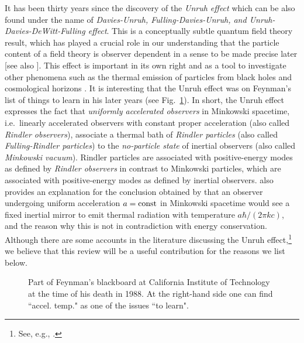 \documentclass[12pt,nofootinbib,floatfix,aps,prd,showpacs,amsmath,amssymb,eqsecnum]{revtex4-2}
\begin{document}
It has been thirty years since the discovery of the {\em Unruh
effect} \cite{Unruh76} which can be also found under the name of 
{\em Davies-Unruh, Fulling-Davies-Unruh, {\rm and} 
Unruh-Davies-DeWitt-Fulling effect}. This is a conceptually subtle 
quantum field theory result, which has played a crucial role 
in our understanding that the particle content of a field 
theory is observer dependent in a sense to be made precise 
later \cite{Fulling73} [see also \textcite{Unruh77}]. This effect
is important 
in its own right and as a tool to investigate other phenomena 
such as the thermal emission of particles from black holes 
\cite{Hawking74, Hawking75} and cosmological horizons 
\cite{Gibbonsetal77}. 
It is interesting that the Unruh effect was on Feynman's list of things
to learn in his later years (see Fig.~\ref{feyn1}).
In short, the Unruh effect expresses the fact that {\em uniformly 
accelerated observers} in Minkowski spacetime, i.e.~linearly 
accelerated observers with constant proper acceleration (also called 
{\em Rindler observers}), associate a thermal bath of {\em Rindler 
particles} (also called {\em Fulling-Rindler particles}) 
to the {\em no-particle state} of inertial observers
(also called {\em Minkowski vacuum}). 
Rindler particles are associated with positive-energy modes as 
defined by {\em Rindler observers} in contrast to Minkowski particles, 
which are associated with positive-energy modes as defined by inertial 
observers. \textcite{Unruh76} also provides an explanation for 
the conclusion obtained by \textcite{Davies75} 
that an observer undergoing uniform acceleration $a = {\rm const}$ 
in Minkowski spacetime would see a fixed inertial mirror to emit 
thermal radiation with temperature $a \hbar/(2 \pi k c )$, and the reason 
why this is not in contradiction with energy conservation. 
Although there are some accounts in the literature discussing the 
Unruh effect,\footnote{See, e.g.,
\textcite{Birrelletal82,Fullingetal87,Takagi86,
          Ginzburgetal87,WaldQFTCS,Sciamaetal81}.
                       }
we believe that this review will be a useful contribution 
for the reasons we list below. 
\begin{figure}[t]
\caption{\label{feyn1} Part of Feynman's blackboard at California
Institute of Technology 
at the time of his death in 1988. At the right-hand side 
one can find ``accel. temp." as one of the issues ``to learn".}
\end{figure}
\end{document}
